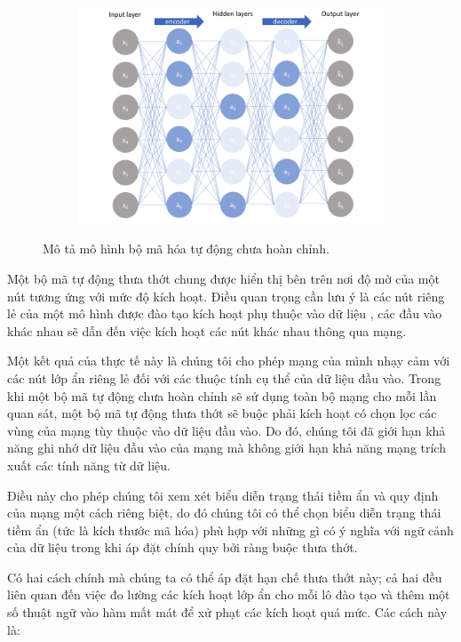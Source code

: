 \begin{figure}
    \begin{subfigure}{0.8\textwidth}
        \includegraphics[width=1.\linewidth]{Chapters/items/auto4.jpg}
        \caption{}
        \label{fig: auto4}
    \end{subfigure}
    \caption{Mô tả mô hình bộ mã hóa tự động chưa hoàn chỉnh.}
\end{figure}

\newpage
Một bộ mã tự động thưa thớt chung được hiển thị bên trên nơi
độ mờ của một nút tương ứng với mức độ kích hoạt. Điều quan
trọng cần lưu ý là các nút riêng lẻ của một mô hình được đào
tạo kích hoạt phụ thuộc vào dữ liệu , các đầu vào khác nhau
sẽ dẫn đến việc kích hoạt các nút khác nhau thông qua mạng.

Một kết quả của thực tế này là chúng tôi cho phép mạng của
mình nhạy cảm với các nút lớp ẩn riêng lẻ đối với các thuộc
tính cụ thể của dữ liệu đầu vào. Trong khi một bộ mã tự động
chưa hoàn chỉnh sẽ sử dụng toàn bộ mạng cho mỗi lần quan sát,
một bộ mã tự động thưa thớt sẽ buộc phải kích hoạt có chọn lọc
các vùng của mạng tùy thuộc vào dữ liệu đầu vào. Do đó, chúng
tôi đã giới hạn khả năng ghi nhớ dữ liệu đầu vào của mạng mà
không giới hạn khả năng mạng trích xuất các tính năng từ dữ liệu.

Điều này cho phép chúng tôi xem xét biểu diễn trạng thái tiềm ẩn
và quy định của mạng một cách riêng biệt, do đó chúng tôi có thể
chọn biểu diễn trạng thái tiềm ẩn (tức là kích thước mã hóa) phù
hợp với những gì có ý nghĩa với ngữ cảnh của dữ liệu trong khi áp
đặt chính quy bởi ràng buộc thưa thớt.

Có hai cách chính mà chúng ta có thể áp đặt hạn chế thưa thớt này;
cả hai đều liên quan đến việc đo lường các kích hoạt lớp ẩn
cho mỗi lô đào tạo và thêm một số thuật ngữ vào hàm mất mát để
xử phạt các kích hoạt quá mức. Các cách này là:

